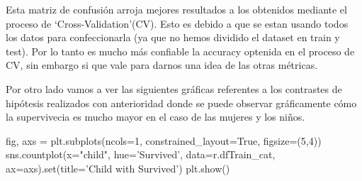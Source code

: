 \documentclass[
]{article}
\newenvironment{Shaded}{\begin{snugshade}}{\end{snugshade}}
\newcommand{\BuiltInTok}[1]{\textcolor[rgb]{0.80,0.80,0.80}{#1}}
\newcommand{\DataTypeTok}[1]{\textcolor[rgb]{0.87,0.87,0.75}{#1}}
\newcommand{\DecValTok}[1]{\textcolor[rgb]{0.86,0.86,0.80}{#1}}
\newcommand{\KeywordTok}[1]{\textcolor[rgb]{0.94,0.87,0.69}{#1}}
\newcommand{\NormalTok}[1]{\textcolor[rgb]{0.80,0.80,0.80}{#1}}
\newcommand{\OperatorTok}[1]{\textcolor[rgb]{0.94,0.94,0.82}{#1}}
\newcommand{\StringTok}[1]{\textcolor[rgb]{0.80,0.58,0.58}{#1}}
\newcommand{\VariableTok}[1]{\textcolor[rgb]{0.80,0.80,0.80}{#1}}
\begin{document}
Esta matriz de confusión arroja mejores resultados a los obtenidos
mediante el proceso de `Cross-Validation'(CV). Esto es debido a que se
estan usando todos los datos para confeccionarla (ya que no hemos
dividido el dataset en train y test). Por lo tanto es mucho más
confiable la accuracy optenida en el proceso de CV, sin embargo si que
vale para darnos una idea de las otras métricas.

Por otro lado vamos a ver las siguientes gráficas referentes a los
contrastes de hipótesis realizados con anterioridad donde se puede
observar gráficamente cómo la supervivecia es mucho mayor en el caso de
las mujeres y los niños.

\begin{Shaded}
\end{Shaded}

\begin{Shaded}
\begin{Highlighting}[]
\NormalTok{fig, axs }\OperatorTok{=}\NormalTok{ plt.subplots(ncols}\OperatorTok{=}\DecValTok{1}\NormalTok{, constrained_layout}\OperatorTok{=}\VariableTok{True}\NormalTok{, figsize}\OperatorTok{=}\NormalTok{(}\DecValTok{5}\NormalTok{,}\DecValTok{4}\NormalTok{))}
\NormalTok{sns.countplot(x}\OperatorTok{=}\StringTok{"child"}\NormalTok{, hue}\OperatorTok{=}\StringTok{'Survived'}\NormalTok{, data}\OperatorTok{=}\NormalTok{r.dfTrain_cat, ax}\OperatorTok{=}\NormalTok{axs).}\BuiltInTok{set}\NormalTok{(title}\OperatorTok{=}\StringTok{'Child with Survived'}\NormalTok{)}
\NormalTok{plt.show()}
\end{Highlighting}
\end{Shaded}
\end{document}
